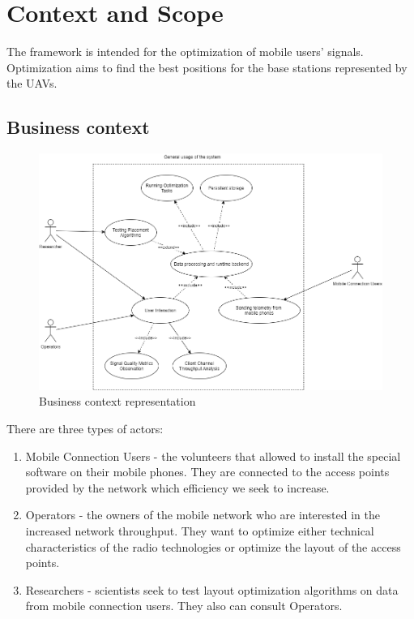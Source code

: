 \section{Context and Scope}\label{context-and-scope}

The framework is intended for the
optimization of mobile users' signals. Optimization aims to find the
best positions for the base stations represented by the UAVs.

\subsection{Business context}\label{business-context}

\begin{figure}[H]
\centering
	\includegraphics[width=\linewidth]{schemes/use-case/Main-Usage-Use-Case.png}
\caption{Business context representation}
	\label{fig:business_context_representation}
\end{figure}

There are three types of actors:

\begin{enumerate}
\def\labelenumi{\arabic{enumi}.}

\item
  Mobile Connection Users - the volunteers that allowed to install the
  special software on their mobile phones. They are
  connected to the access points provided by the network which
  efficiency we seek to increase.
\item
  Operators - the owners of the mobile network who are interested in the
  increased network throughput. They want to optimize either technical
  characteristics of the radio technologies or optimize the layout of
  the access points.
\item
  Researchers - scientists seek to test layout optimization
  algorithms on data from mobile connection users. They
  also can consult Operators.
\end{enumerate}

